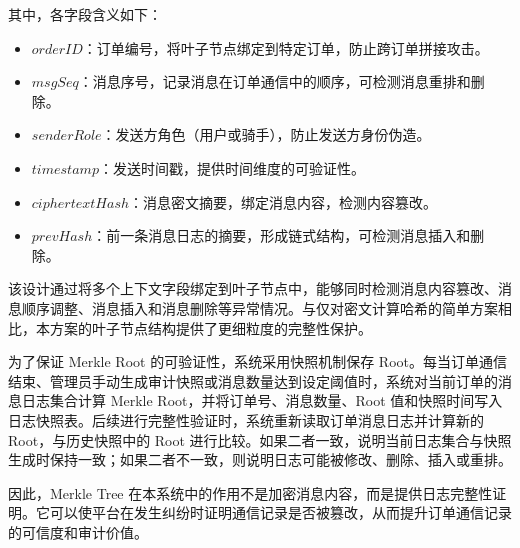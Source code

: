 其中，各字段含义如下：

\begin{itemize}[leftmargin=2em]
\item$\mathit{orderID}$：订单编号，将叶子节点绑定到特定订单，防止跨订单拼接攻击。
\item$\mathit{msgSeq}$：消息序号，记录消息在订单通信中的顺序，可检测消息重排和删除。
\item$\mathit{senderRole}$：发送方角色（用户或骑手），防止发送方身份伪造。
\item$\mathit{timestamp}$：发送时间戳，提供时间维度的可验证性。
\item$\mathit{ciphertextHash}$：消息密文摘要，绑定消息内容，检测内容篡改。
\item$\mathit{prevHash}$：前一条消息日志的摘要，形成链式结构，可检测消息插入和删除。
\end{itemize}

该设计通过将多个上下文字段绑定到叶子节点中，能够同时检测消息内容篡改、消息顺序调整、消息插入和消息删除等异常情况。与仅对密文计算哈希的简单方案相比，本方案的叶子节点结构提供了更细粒度的完整性保护。

为了保证 Merkle Root 的可验证性，系统采用快照机制保存 Root。每当订单通信结束、管理员手动生成审计快照或消息数量达到设定阈值时，系统对当前订单的消息日志集合计算 Merkle Root，并将订单号、消息数量、Root 值和快照时间写入日志快照表。后续进行完整性验证时，系统重新读取订单消息日志并计算新的 Root，与历史快照中的 Root 进行比较。如果二者一致，说明当前日志集合与快照生成时保持一致；如果二者不一致，则说明日志可能被修改、删除、插入或重排。

因此，Merkle Tree 在本系统中的作用不是加密消息内容，而是提供日志完整性证明。它可以使平台在发生纠纷时证明通信记录是否被篡改，从而提升订单通信记录的可信度和审计价值。
